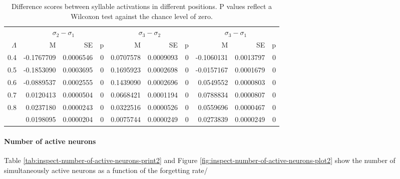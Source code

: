 \documentclass[
]{article}
\begin{document}
\begin{table}

\caption{\label{tab:basic-experiment-global-print-act-in-words-table2}Difference scores between syllable activations in different positions. P values reflect a Wilcoxon test against the chance level of zero.}
\centering
\begin{tabular}[t]{rrrrrrrrrr}
\toprule
\multicolumn{1}{c}{ } & \multicolumn{3}{c}{$\sigma_2 - \sigma_1$} & \multicolumn{3}{c}{$\sigma_3 - \sigma_2$} & \multicolumn{3}{c}{$\sigma_3 - \sigma_1$} \\
\cmidrule(l{3pt}r{3pt}){2-4} \cmidrule(l{3pt}r{3pt}){5-7} \cmidrule(l{3pt}r{3pt}){8-10}
$\Lambda$ & M & SE & p & M & SE & p & M & SE & p\\
\midrule
0.4 & -0.1767709 & 0.0006546 & 0 & 0.0707578 & 0.0009093 & 0 & -0.1060131 & 0.0013797 & 0\\
0.5 & -0.1853090 & 0.0003695 & 0 & 0.1695923 & 0.0002698 & 0 & -0.0157167 & 0.0001679 & 0\\
0.6 & -0.0889537 & 0.0002555 & 0 & 0.1439090 & 0.0002696 & 0 & 0.0549552 & 0.0000803 & 0\\
0.7 & 0.0120413 & 0.0000504 & 0 & 0.0668421 & 0.0001194 & 0 & 0.0788834 & 0.0000807 & 0\\
0.8 & 0.0237180 & 0.0000243 & 0 & 0.0322516 & 0.0000526 & 0 & 0.0559696 & 0.0000467 & 0\\
\addlinespace
0.9 & 0.0198095 & 0.0000204 & 0 & 0.0075744 & 0.0000249 & 0 & 0.0273839 & 0.0000249 & 0\\
\bottomrule
\end{tabular}
\end{table}

\clearpage

\hypertarget{number-of-active-neurons}{%
\paragraph{Number of active neurons}\label{number-of-active-neurons}}

Table \ref{tab:inspect-number-of-active-neurons-print2} and Figure
\ref{fig:inspect-number-of-active-neurons-plot2} show the number of
simultaneously active neurons as a function of the forgetting rate/
\end{document}
